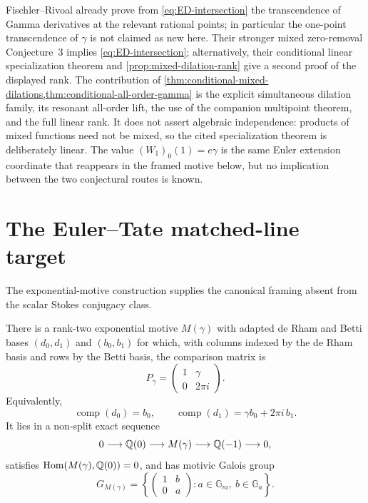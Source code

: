\begin{remark}
Fischler--Rivoal already prove from \eqref{eq:ED-intersection} the
transcendence of Gamma derivatives at the relevant rational points; in
particular the one-point transcendence of \(\gamma\) is not claimed as new
here.  Their stronger mixed zero-removal Conjecture~3 implies
\eqref{eq:ED-intersection}; alternatively, their conditional linear
specialization theorem and \cref{prop:mixed-dilation-rank} give a second
proof of the displayed rank.  The contribution of
\cref{thm:conditional-mixed-dilations,thm:conditional-all-order-gamma} is
the explicit simultaneous dilation family, its resonant all-order lift, the
use of the companion multipoint theorem, and the full linear rank.  It
does not assert algebraic independence: products of mixed functions need
not be mixed, so the cited specialization theorem is deliberately linear.
The value \((W_1)_0(1)=e\gamma\) is the same Euler extension coordinate
that reappears in the framed motive below, but no implication between the
two conjectural routes is known.
\end{remark}

\section{The Euler--Tate matched-line target}
\label{sec:euler-tate}

The exponential-motive construction supplies the canonical framing absent
from the scalar Stokes conjugacy class.

\begin{theorem}
\label{thm:FJ-euler-motive}
There is a rank-two exponential motive \(M(\gamma)\) with adapted de Rham
and Betti bases \((d_0,d_1)\) and \((b_0,b_1)\) for which, with columns
indexed by the de Rham basis and rows by the Betti basis, the comparison
matrix is
\begin{equation}\label{eq:euler-period-matrix}
 P_\gamma=\begin{pmatrix}1&\gamma\\0&2\pi i\end{pmatrix}.
\end{equation}
Equivalently,
\[
 \operatorname{comp}(d_0)=b_0,
 \qquad
 \operatorname{comp}(d_1)=\gamma b_0+2\pi i\,b_1.
\]
It lies in a non-split exact sequence
\begin{equation}\label{eq:euler-motive-extension}
 0\longrightarrow\mathbb Q(0)\longrightarrow M(\gamma)
 \longrightarrow\mathbb Q(-1)\longrightarrow0,
\end{equation}
satisfies \(\operatorname{Hom}(M(\gamma),\mathbb Q(0))=0\), and has motivic
Galois group
\[
 G_{M(\gamma)}=
 \left\{\begin{pmatrix}1&b\\0&a\end{pmatrix}:
 a\in\mathbb G_m,\ b\in\mathbb G_a\right\}.
\]
\end{theorem}

